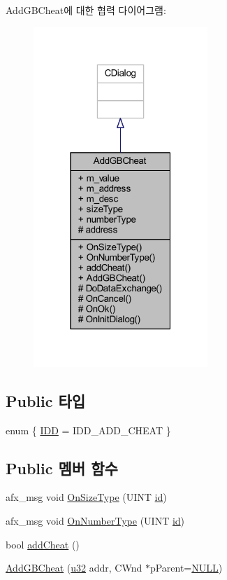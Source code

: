 Add\+G\+B\+Cheat에 대한 협력 다이어그램\+:\nopagebreak
\begin{figure}[H]
\begin{center}
\leavevmode
\includegraphics[width=187pt]{class_add_g_b_cheat__coll__graph}
\end{center}
\end{figure}
\subsection*{Public 타입}
\begin{DoxyCompactItemize}
\item 
enum \{ \mbox{\hyperlink{class_add_g_b_cheat_ae307c54936e2ef002f6323ab0d1fa05eaa142321cb7a25da95b16f0c2ea74993f}{I\+DD}} = I\+D\+D\+\_\+\+A\+D\+D\+\_\+\+C\+H\+E\+AT
 \}
\end{DoxyCompactItemize}
\subsection*{Public 멤버 함수}
\begin{DoxyCompactItemize}
\item 
afx\+\_\+msg void \mbox{\hyperlink{class_add_g_b_cheat_a9bff22f01c72ffbcd6071bb604c2e090}{On\+Size\+Type}} (U\+I\+NT \mbox{\hyperlink{_commands_8cpp_a7b7a6396b2c82ad46c6d8b2bf141a8dd}{id}})
\item 
afx\+\_\+msg void \mbox{\hyperlink{class_add_g_b_cheat_a1bfddb9d66e182dedc95bf889dc9e6d2}{On\+Number\+Type}} (U\+I\+NT \mbox{\hyperlink{_commands_8cpp_a7b7a6396b2c82ad46c6d8b2bf141a8dd}{id}})
\item 
bool \mbox{\hyperlink{class_add_g_b_cheat_a054ba5040a40f7ef4b3a0ddb5a458592}{add\+Cheat}} ()
\item 
\mbox{\hyperlink{class_add_g_b_cheat_a1794ccc1e4826b5a8b179d20557955b8}{Add\+G\+B\+Cheat}} (\mbox{\hyperlink{_system_8h_a10e94b422ef0c20dcdec20d31a1f5049}{u32}} addr, C\+Wnd $\ast$p\+Parent=\mbox{\hyperlink{_system_8h_a070d2ce7b6bb7e5c05602aa8c308d0c4}{N\+U\+LL}})
\end{DoxyCompactItemize}
